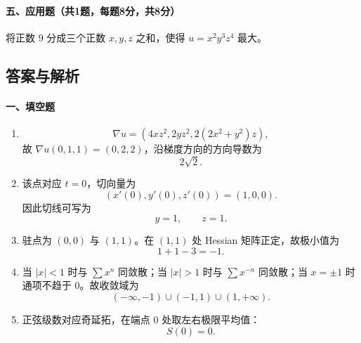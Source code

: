 \paragraph*{五、应用题（共1题，每题8分，共8分）}
将正数 \(9\) 分成三个正数 \(x,y,z\) 之和，使得 \(u=x^2y^3z^4\) 最大。

\subsection{答案与解析}

\paragraph*{一、填空题}
\begin{enumerate}
  \item
  \[
    \nabla u=(4xz^2,2yz^2,2(2x^2+y^2)z),
  \]
  故 \(\nabla u(0,1,1)=(0,2,2)\)，沿梯度方向的方向导数为
  \[
    2\sqrt2.
  \]
  \item 该点对应 \(t=0\)，切向量为
  \[
    (x'(0),y'(0),z'(0))=(1,0,0).
  \]
  因此切线可写为
  \[
    y=1,\qquad z=1.
  \]
  \item 驻点为 \((0,0)\) 与 \((1,1)\)。在 \((1,1)\) 处 Hessian 矩阵正定，故极小值为
  \[
    1+1-3=-1.
  \]
  \item 当 \(|x|<1\) 时与 \(\sum x^n\) 同敛散；当 \(|x|>1\) 时与 \(\sum x^{-n}\) 同敛散；当 \(x=\pm1\) 时通项不趋于 \(0\)。故收敛域为
  \[
    (-\infty,-1)\cup(-1,1)\cup(1,+\infty).
  \]
  \item 正弦级数对应奇延拓，在端点 \(0\) 处取左右极限平均值：
  \[
    S(0)=0.
  \]
\end{enumerate}

